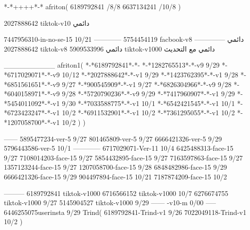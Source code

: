 *-*++++*-*
afriton(
6189792841 /8/8
6637134241 /10/8
)

2027888642 tiktok-v10
دائمي


7447956310-in-no-se-15 10/21
------------
5754454119 facbook-v8
دائمي
--------------
2027888642 tiktok-v8
دائمي
5909533996 tiktok-v1000
دائمي مع التحديث

__________
afriton1(
*-*6189792841*-*-
*-*1282765513*-*-v9 9/29
*-*6717029071*-*-v9 10/12
*-*2027888642*-*-v1 9/29
*-*1423762395*-*-v1 9/28
*-*6851561651*-*-v9 9/27
*-*900545909*-*-v1 9/27
*-*6826304966*-*-v9 9/28
*-*6040158971*-*-v9 9/28
*-*5720790236*-*-v9 9/29
*-*7417960907*-*-v1 9/29
*-*5454011092*-*-v1 9/30
*-*7033588775*-*-v1 10/1
*-*6542421545*-*-v1 10/1
*-*6723423247*-*-v1 10/2
*-*6911532901*-*-v1 10/2
*-*7361295055*-*-v1 10/2
*-*1207058700*-*-v1 10/2
)
)

------
5895477234-ver-5 9/27
801465809-ver-5 9/27
6666421326-ver-5 9/29
5796443586-ver-5 10/1
------------
6717029071-Ver-11
10/4
6425488313-face-15 9/27
7108014203-face-15 9/27
5854432895-face-15 9/27
7163597863-face-15 9/27
1357123244-face-15 9/27
1207058700-face-15 9/28
6848482986-face-15 9/29
6666421326-face-15 9/29
904497894-face-15 10/21
7187874209-face-15 10/2

---------
6189792841 tiktok-v1000
6716566152 tiktok-v1000
10/7
6276674755 tiktok-v1000
9/27
5145904527 tiktok-v1000
9/29
------
-v10-m 0/00
-----
6446255075userinsta 9/29
Trind(
6189792841-Trind-v1 9/26
7022049118-Trind-v1 10/2
)
